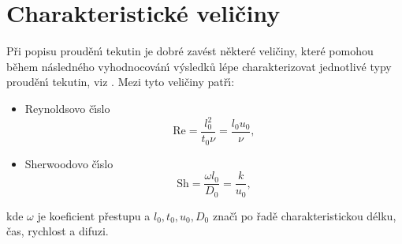         
        
        
        
        


    \section{Charakteristick\'e veli\v{c}iny}
    \label{sec:ChaVal}
        
        P\v{r}i popisu proud\v{e}n\'{\i} tekutin je dobr\'{e} zav\'{e}st n\v{e}kter\'{e} veli\v{c}iny, kter\'{e} pomohou b\v{e}hem n\'{a}sledn\'{e}ho vyhodnocov\'{a}n\'{\i} v\'{y}sledk\r{u} l\'{e}pe charakterizovat jednotliv\'{e} typy proud\v{e}n\'{\i} tekutin, viz \cite{ruzicka2008dimensionless}. Mezi tyto veli\v{c}iny pat\v{r}\'{\i}:
        \begin{itemize}
            \item Reynoldsovo \v{c}\'{\i}slo \begin{equation}
                \label{eq:ReyNum}
                    \mathrm{Re} = \frac{l_{0}^{2}}{t_{0}\nu} = \frac{l_{0}u_{0}}{\nu},
                \end{equation}
            \item Sherwoodovo \v{c}\'{\i}slo \begin{equation}
                \label{eq:SheNum}
                    \mathrm{Sh} = \frac{\omega l_{0}}{D_{0}} = \frac{k}{u_0},
                \end{equation}
            \end{itemize}
        kde $\omega$ je koeficient p\v{r}estupu a $l_0, t_0, u_0, D_0$ zna\v{c}\'{\i} po \v{r}ad\v{e} charakteristickou d\'{e}lku, \v{c}as, rychlost a difuzi.
            
